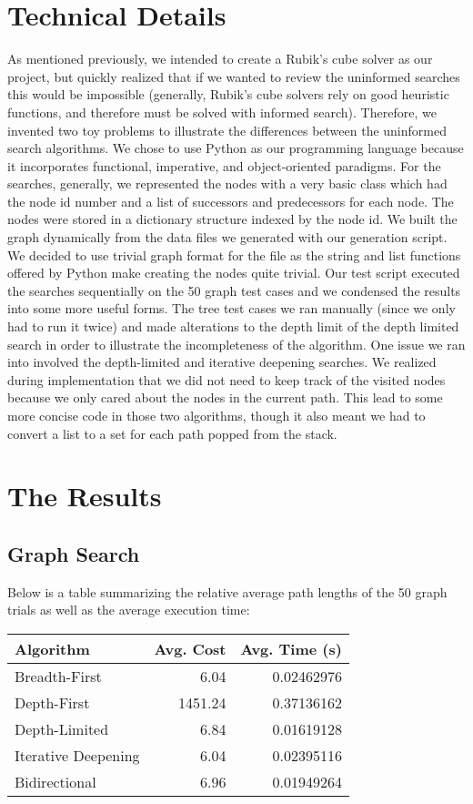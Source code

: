 \documentclass[a4paper,11pt]{report}
\begin{document}
\section{Technical Details}
As mentioned previously, we intended to create a Rubik's cube solver as our
project, but quickly realized that if we wanted to review the uninformed
searches this would be impossible (generally, Rubik's cube solvers rely on good
heuristic functions, and therefore must be solved with informed search).
Therefore, we invented two toy problems to illustrate the differences between
the uninformed search algorithms. We chose to use Python as our programming
language because it incorporates functional, imperative, and object-oriented
paradigms.  For the searches, generally, we represented the nodes with a very
basic class which had the node id number and a list of successors and
predecessors for each node.  The nodes were stored in a dictionary structure
indexed by the node id.  We built the graph dynamically from the data files we
generated with our generation script.  We decided to use trivial graph format
for the file as the string and list functions offered by Python make creating
the nodes quite trivial. Our test script executed the searches sequentially on
the 50 graph test cases and we condensed the results into some more useful
forms. The tree test cases we ran manually (since we only had to run it twice)
and made alterations to the depth limit of the depth limited search in order to
illustrate the incompleteness of the algorithm.  One issue we ran into involved
the depth-limited and iterative deepening searches.  We realized during
implementation that we did not need to keep track of the visited nodes because
we only cared about the nodes in the current path.  This lead to some more
concise code in those two algorithms, though it also meant we had to convert a
list to a set for each path popped from the stack.

\section{The Results}
\subsection{Graph Search}
Below is a table summarizing the relative average path lengths of the 50
graph trials as well as the average execution time:\vspace{5 mm}

\begin{tabular}{ | l | r | r | }
  \hline
  Algorithm & Avg. Cost & Avg. Time (s) \\ \hline
  Breadth-First & 6.04 & 0.02462976 \\
  Depth-First & 1451.24 & 0.37136162 \\
  Depth-Limited & 6.84 & 0.01619128 \\
  Iterative Deepening & 6.04 & 0.02395116 \\
  Bidirectional & 6.96 & 0.01949264 \\
  \hline
\end{tabular}
\vspace{5 mm}
\end{document}
